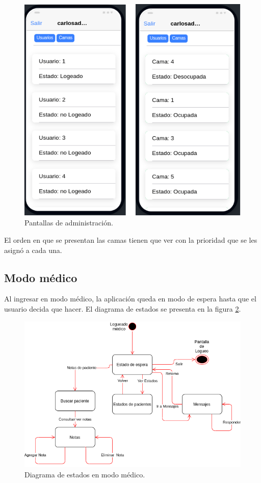 \begin{figure}[ht]
	\centering
	\includegraphics[scale=.70]{./Figures/app/administracion.png}
	\caption{ Pantallas de administración.}
	\label{fig: Pantallas de administración.}
\end{figure} 

El orden en que se presentan las camas tienen que ver con la prioridad que se les asignó a cada una.



\pagebreak
\subsection{Modo médico}
Al ingresar en modo médico, la aplicación queda en modo de espera hasta que el usuario decida que hacer. El diagrama de estados se presenta en la figura \ref{fig: Diagrama de estados en modo médico.}. 

\begin{figure}[ht]
	\centering
	\includegraphics[scale=.65]{./Figures/app/modo-medico.png}
	\caption{ Diagrama de estados en modo médico.}
	\label{fig: Diagrama de estados en modo médico.}
\end{figure} 

